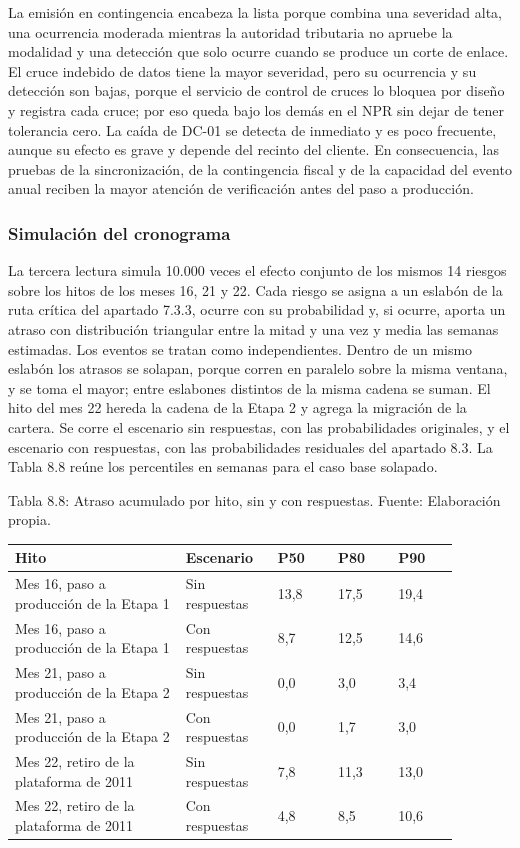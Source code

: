 \documentclass[11pt]{article}
\begin{document}
La emisión en contingencia encabeza la lista porque combina una severidad alta, una ocurrencia moderada mientras la autoridad tributaria no apruebe la modalidad y una detección que solo ocurre cuando se produce un corte de enlace. El cruce indebido de datos tiene la mayor severidad, pero su ocurrencia y su detección son bajas, porque el servicio de control de cruces lo bloquea por diseño y registra cada cruce; por eso queda bajo los demás en el NPR sin dejar de tener tolerancia cero. La caída de DC-01 se detecta de inmediato y es poco frecuente, aunque su efecto es grave y depende del recinto del cliente. En consecuencia, las pruebas de la sincronización, de la contingencia fiscal y de la capacidad del evento anual reciben la mayor atención de verificación antes del paso a producción.

\subsubsection{Simulación del cronograma}

La tercera lectura simula 10.000 veces el efecto conjunto de los mismos 14 riesgos sobre los hitos de los meses 16, 21 y 22. Cada riesgo se asigna a un eslabón de la ruta crítica del apartado 7.3.3, ocurre con su probabilidad y, si ocurre, aporta un atraso con distribución triangular entre la mitad y una vez y media las semanas estimadas. Los eventos se tratan como independientes. Dentro de un mismo eslabón los atrasos se solapan, porque corren en paralelo sobre la misma ventana, y se toma el mayor; entre eslabones distintos de la misma cadena se suman. El hito del mes 22 hereda la cadena de la Etapa 2 y agrega la migración de la cartera. Se corre el escenario sin respuestas, con las probabilidades originales, y el escenario con respuestas, con las probabilidades residuales del apartado 8.3. La Tabla 8.8 reúne los percentiles en semanas para el caso base solapado.

Tabla 8.8: Atraso acumulado por hito, sin y con respuestas. Fuente: Elaboración propia.

\begin{longtable}{p{0.34\linewidth}p{0.18\linewidth}p{0.12\linewidth}p{0.12\linewidth}p{0.12\linewidth}}
\toprule
\textbf{Hito} & \textbf{Escenario} & \textbf{P50} & \textbf{P80} & \textbf{P90} \\
\midrule
\endhead
\bottomrule
\endlastfoot
Mes 16, paso a producción de la Etapa 1 & Sin respuestas & 13,8 & 17,5 & 19,4 \\
Mes 16, paso a producción de la Etapa 1 & Con respuestas & 8,7 & 12,5 & 14,6 \\
Mes 21, paso a producción de la Etapa 2 & Sin respuestas & 0,0 & 3,0 & 3,4 \\
Mes 21, paso a producción de la Etapa 2 & Con respuestas & 0,0 & 1,7 & 3,0 \\
Mes 22, retiro de la plataforma de 2011 & Sin respuestas & 7,8 & 11,3 & 13,0 \\
Mes 22, retiro de la plataforma de 2011 & Con respuestas & 4,8 & 8,5 & 10,6 \\
\end{longtable}
\end{document}
